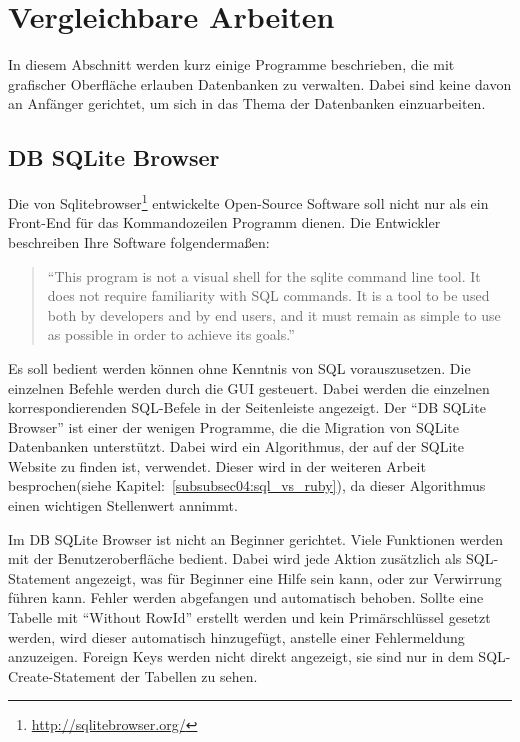 \section{Vergleichbare Arbeiten}
\label{sec02:vergleichbare_arbeiten}
In diesem Abschnitt werden kurz einige Programme beschrieben, die mit grafischer Oberfläche erlauben Datenbanken zu verwalten. Dabei sind keine davon an Anfänger gerichtet, um sich in das Thema der Datenbanken einzuarbeiten. 

\subsection{DB SQLite Browser}
\label{sec02:sqlite_browser}
Die von Sqlitebrowser\footnote{\url{http://sqlitebrowser.org/}} entwickelte Open-Source Software soll nicht nur als ein Front-End für das Kommandozeilen Programm dienen. Die Entwickler beschreiben Ihre Software folgendermaßen:
\begin{quote}
``This program is not a visual shell for the sqlite command line tool. It does not require familiarity with SQL commands. It is a tool to be used both by developers and by end users, and it must remain as simple to use as possible in order to achieve its goals.''~\cite{db_sqlite_browser}
\end{quote}

Es soll bedient werden können ohne Kennt­nis von SQL vorauszusetzen. Die einzelnen Befehle werden durch die GUI gesteuert. Dabei werden die einzelnen korrespondierenden SQL-Befele in der Seitenleiste angezeigt.
Der ``DB SQLite Browser'' ist einer der wenigen Programme, die die Migration von SQLite Datenbanken unterstützt. Dabei wird ein Algorithmus, der auf der SQLite Website zu finden ist, verwendet. Dieser wird in der weiteren Arbeit besprochen(siehe Kapitel:~\ref{subsubsec04:sql_vs_ruby}), da dieser Algorithmus einen wichtigen Stellenwert annimmt.

Im DB SQLite Browser ist nicht an Beginner gerichtet. Viele Funktionen werden mit der Benutzeroberfläche bedient. Dabei wird jede Aktion zusätzlich als SQL-Statement angezeigt, was für Beginner eine Hilfe sein kann, oder zur Verwirrung führen kann. 
Fehler werden abgefangen und automatisch behoben. Sollte eine Tabelle mit ``Without RowId'' erstellt werden und kein Primärschlüssel gesetzt werden, wird dieser automatisch hinzugefügt, anstelle einer Fehlermeldung anzuzeigen.
Foreign Keys werden nicht direkt angezeigt, sie sind nur in dem SQL-Create-Statement der Tabellen zu sehen.

